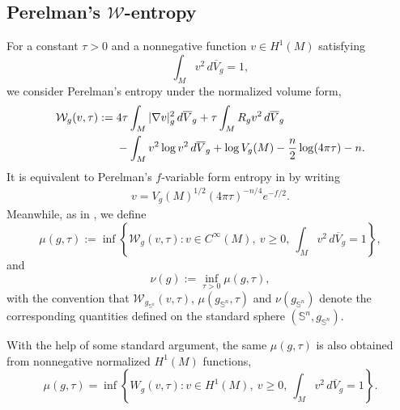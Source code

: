 \documentclass[11pt, reqno]{amsart}
\numberwithin{equation}{section}
\theoremstyle{remark}
\newcommand{\Sph}{\mathbb S}
\newcommand{\dbarV}[1]{d\overline V_{#1}}
\newcommand{\W}{\mathcal{W}}
\begin{document}
\subsection{\bf Perelman’s $\W$-entropy}
For a constant $\tau>0$ and a nonnegative function $v\in H^1(M)$ satisfying
\begin{equation}\label{eq:L2-normalization}
\int_Mv^2\,\dbarV g=1,
\end{equation}
we consider Perelman’s entropy \cite{Perelman} under the normalized volume form,
\begin{align}
\W_g(v,\tau):={}&4\tau\int_M|\nabla v|_g^2\,\dbarV g
+\tau\int_MR_gv^2\,\dbarV g\notag\\
&-\int_Mv^2\log v^2\,\dbarV g
+\log V_g(M)-\frac n2\log(4\pi\tau)-n.\label{eq:W-probability}
\end{align}
It is equivalent to Perelman's $f$-variable form entropy in \cite{Perelman} by writing
\begin{align}
v=V_g(M)^{1/2}(4\pi\tau)^{-n/4}e^{-f/2}.
\end{align}
 Meanwhile, as in \cite{Perelman}, we define
\begin{equation}\label{eq:mu-nu-definitions}
\mu(g,\tau):=\inf\left\{\W_g(v,\tau):
v\in C^\infty(M),\ v\ge0,\ \int_Mv^2\,\dbarV g=1\right\},
\end{equation}
and 
\begin{equation}\label{eq:mu-nu-definitions-2}
\nu(g):=\inf_{\tau>0}\mu(g,\tau),
\end{equation}
with the convention that $\W_{g_{\Sph^n}}(v,\tau)$, $\mu(g_{\Sph^n},\tau)$ and $\nu(g_{\Sph^n})$ denote the corresponding quantities defined on the standard sphere $(\Sph^n,g_{\Sph^n})$.




With the help of some standard argument, the same $\mu(g,\tau)$ is also obtained from
nonnegative normalized $H^1(M)$ functions,
\begin{equation}\label{eq:H1-mu}
\mu(g,\tau)=\inf\left\{W_g(v,\tau):v\in H^1(M),\ v\geq0,
\ \int_Mv^2\,\dbarV g=1\right\}.
\end{equation}
\end{document}
